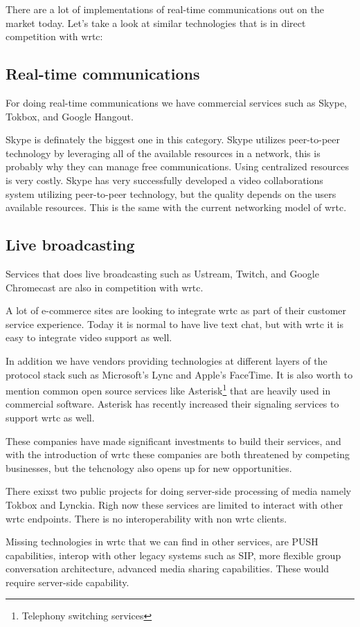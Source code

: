 There are a lot of implementations of real-time communications out on the market today. Let's take a look at similar technologies\cite{lopez_fernandez_catalysing_2013} that is in direct competition with \gls{wrtc}:

\subsection{Real-time communications}
For doing real-time communications we have commercial services such as Skype, Tokbox, and Google Hangout. 

Skype is definately the biggest one in this category. Skype utilizes peer-to-peer technology by leveraging all of the available resources in a network, this is probably why they can manage free communications. Using centralized resources is very costly. Skype has very successfully developed a video collaborations system utilizing peer-to-peer technology, but the quality depends on the users available resources. This is the same with the current networking model of \gls{wrtc}.

\subsection{Live broadcasting}
Services that does live broadcasting such as Ustream, Twitch, and Google Chromecast are also in competition with \gls{wrtc}. 

A lot of e-commerce sites are looking to integrate \gls{wrtc} as part of their customer service experience. Today it is normal to have live text chat, but with \gls{wrtc} it is easy to integrate video support as well.

In addition we have vendors providing technologies at different layers of the protocol stack such as Microsoft's Lync and Apple's FaceTime. It is also worth to mention common open source services like Asterisk\footnote{Telephony switching services} that are heavily used in commercial software. Asterisk has recently increased their signaling services to support \gls{wrtc} as well.

These companies have made significant investments to build their services, and with the introduction of \gls{wrtc} these companies are both threatened by competing businesses, but the tehcnology also opens up for new opportunities.

There exixst two public projects for doing server-side processing of media namely Tokbox and Lynckia. Righ now these services are limited to interact with other \gls{wrtc} endpoints. There is no interoperability with non \gls{wrtc} clients.

Missing technologies in \gls{wrtc} that we can find in other services, are PUSH capabilities, interop with other legacy systems such as SIP, more flexible group conversation architecture, advanced media sharing capabilities. These would require server-side capability.